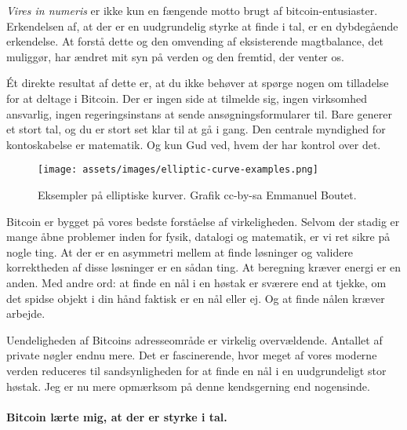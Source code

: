 \textit{Vires in numeris} er ikke kun en fængende motto brugt af 
bitcoin-entusiaster. Erkendelsen af, at der er en uudgrundelig styrke at finde 
i tal, er en dybdegående erkendelse. At forstå dette og den omvending af 
eksisterende magtbalance, det muliggør, har ændret mit syn på verden og den 
fremtid, der venter os.

Ét direkte resultat af dette er, at du ikke behøver at spørge nogen om 
tilladelse for at deltage i Bitcoin. Der er ingen side at tilmelde sig, ingen 
virksomhed ansvarlig, ingen regeringsinstans at sende ansøgningsformularer 
til. Bare generer et stort tal, og du er stort set klar til at gå i gang. 
Den centrale myndighed for kontoskabelse er matematik. Og kun Gud ved, hvem 
der har kontrol over det.

\begin{figure}[htbp]
  \centering
  \texttt{[image: assets/images/elliptic-curve-examples.png]}
  \caption{Eksempler på elliptiske kurver. Grafik cc-by-sa Emmanuel Boutet.}
  \label{fig:elliptic-curve-examples}
\end{figure}

Bitcoin er bygget på vores bedste forståelse af virkeligheden. Selvom der 
stadig er mange åbne problemer inden for fysik, datalogi og matematik, er vi 
ret sikre på nogle ting. At der er en asymmetri mellem at finde løsninger og
validere korrektheden af disse løsninger er en sådan ting. At beregning kræver 
energi er en anden. Med andre ord: at finde en nål i en høstak er sværere end 
at tjekke, om det spidse objekt i din hånd faktisk er en nål eller ej. Og at 
finde nålen kræver arbejde.

Uendeligheden af Bitcoins adresseområde er virkelig overvældende. Antallet af 
private nøgler endnu mere. Det er fascinerende, hvor meget af vores moderne 
verden reduceres til sandsynligheden for at finde en nål i en uudgrundeligt 
stor høstak. Jeg er nu mere opmærksom på denne kendsgerning end nogensinde.

\paragraph{Bitcoin lærte mig, at der er styrke i tal.}

